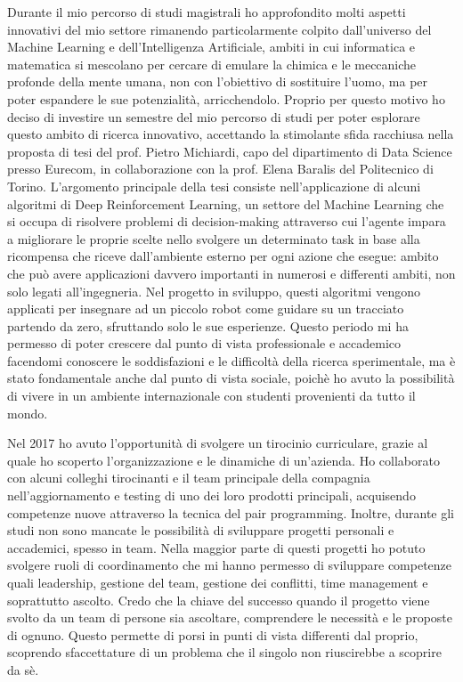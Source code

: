\documentclass[11pt, a4paper]{dogear-cv}
\begin{document}
\begin{cvletter}
Durante il mio percorso di studi magistrali ho approfondito molti aspetti innovativi del mio settore rimanendo particolarmente colpito dall'universo del Machine Learning e dell'Intelligenza Artificiale, ambiti in cui informatica e matematica si mescolano per cercare di emulare la chimica e le meccaniche profonde della mente umana, non con l'obiettivo di sostituire l'uomo, ma per poter espandere le sue potenzialità, arricchendolo.
Proprio per questo motivo ho deciso di investire un semestre del mio percorso di studi per poter esplorare questo ambito di ricerca innovativo, accettando la stimolante sfida racchiusa nella proposta di tesi del prof. Pietro Michiardi, capo del dipartimento di Data Science presso Eurecom, in collaborazione con la prof. Elena Baralis del Politecnico di Torino.
L'argomento principale della tesi consiste nell'applicazione di alcuni algoritmi di Deep Reinforcement Learning, un settore del Machine Learning che si occupa di risolvere problemi di decision-making attraverso cui l'agente impara a migliorare le proprie scelte nello svolgere un determinato task in base alla ricompensa che riceve dall'ambiente esterno per ogni azione che esegue: ambito che può avere applicazioni davvero importanti in numerosi e differenti ambiti, non solo legati all'ingegneria. Nel progetto in sviluppo, questi algoritmi vengono applicati per insegnare ad un piccolo robot come guidare su un tracciato partendo da zero, sfruttando solo le sue esperienze.
Questo periodo mi ha permesso di poter crescere dal punto di vista professionale e accademico facendomi conoscere le soddisfazioni e le difficoltà della ricerca sperimentale, ma è stato fondamentale anche dal punto di vista sociale, poichè ho avuto la possibilità di vivere in un ambiente internazionale con studenti provenienti da tutto il mondo.

Nel 2017 ho avuto l'opportunità di svolgere un tirocinio curriculare, grazie al quale ho scoperto l'organizzazione e le dinamiche di un'azienda. Ho collaborato con alcuni colleghi tirocinanti e il team principale della compagnia nell'aggiornamento e testing di uno dei loro prodotti principali, acquisendo competenze nuove attraverso la tecnica del pair programming.
Inoltre, durante gli  studi non sono mancate le possibilità di sviluppare progetti personali e accademici, spesso in team. Nella maggior parte di questi progetti ho potuto svolgere ruoli di coordinamento che mi hanno permesso di sviluppare competenze quali leadership, gestione del team, gestione dei conflitti, time management e soprattutto ascolto. Credo che la chiave del successo quando il progetto viene svolto da un team di persone sia ascoltare, comprendere le necessità e le proposte di ognuno. Questo permette di porsi in punti di vista differenti dal proprio, scoprendo sfaccettature di un problema che il singolo non riuscirebbe a scoprire da sè.


\end{cvletter}
\end{document}
